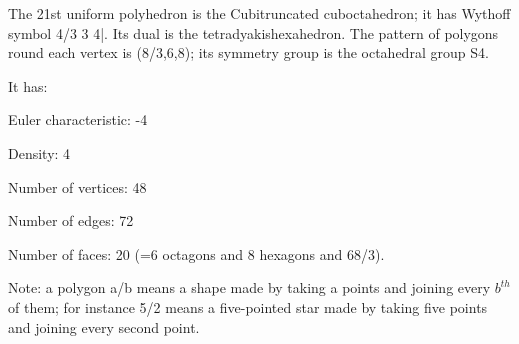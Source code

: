 The 21st uniform polyhedron is the Cubitruncated cuboctahedron; it has Wythoff symbol 4/3 3 4|. Its dual is the tetradyakishexahedron. The pattern of polygons round each vertex is (8/3,6,8); its symmetry group is the octahedral group S4.\par
It has:\par
Euler characteristic: -4\par
Density: 4\par
Number of vertices: 48\par
Number of edges:  72\par
Number of faces: 20 (=6 octagons and 8 hexagons and 6{8/3}).\par
Note: a polygon a/b means a shape made by taking a points and joining every $b^{th}$  of them; for instance 5/2 means a five-pointed star made by taking five points and joining every second point.